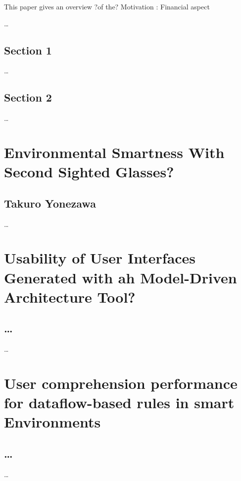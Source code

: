 This paper gives an overview ?of the? 
Motivation : Financial aspect

\dots


\section{Section 1}
\label{ch:Content1:sec:Section1}

\dots


\section{Section 2}
\label{ch:Content1:sec:Section2}

\dots

\chapter{Environmental Smartness With Second Sighted Glasses?}
\label{ch:Content6}

\section{Takuro Yonezawa}
\label{ch:Content6:sec:Section1}

\dots

\chapter{Usability of User Interfaces Generated with ah Model-Driven
Architecture Tool?}
\label{ch:Content7}

\section{\ldots}
\label{ch:Content7:sec:Section1}

\dots

\chapter{User comprehension performance for dataflow-based rules in smart
Environments}
\label{ch:Content8}

\section{\ldots}
\label{ch:Content8:sec:Section1}

\dots
